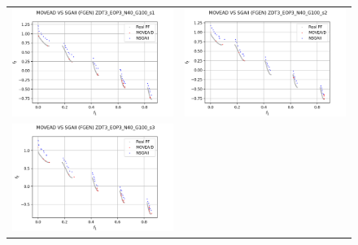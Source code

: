 \begin{figure}[H]
    \centering
    \begin{tabular}{c c}
    \includegraphics[scale=0.5]{figures/ZDT3_EOP3_N40_G100_T6/s1_comp.png} &
    \includegraphics[scale=0.5]{figures/ZDT3_EOP3_N40_G100_T6/s2_comp.png}\\
    \includegraphics[scale=0.5]{figures/ZDT3_EOP3_N40_G100_T6/s3_comp.png} &

\end{tabular}
\end{figure}
